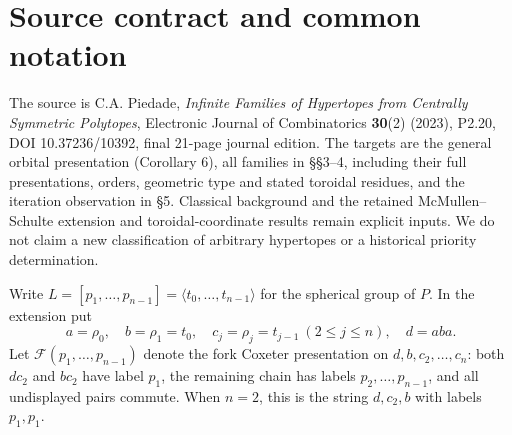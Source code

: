 
\begin{abstract}

We recover the finite matching extensions and regular halved hypertopes associated with every centrally symmetric spherical regular polytope. One orbital-presentation theorem and one parity rewriting give the full defining presentations. The exceptional calculation is an exact orbit census in five finite Coxeter actions. Four published censuses are correct. For the 120-cell there are 35 unordered diagonal classes, rather than the asserted 15; the published presentation omits 20 orbit relations and defines an infinite group for every parameter. We give the missing relations explicitly. The intended finite 120-cell construction, its order and its halved geometry remain valid with the corrected presentation. The original construction and families are attributed to their sources; the correction is distinct from a new open-conjecture solution.

\end{abstract}

\section{Source contract and common notation}\label{source-contract-and-common-notation}

The source is C.A. Piedade, \emph{Infinite Families of Hypertopes from Centrally Symmetric Polytopes}, Electronic Journal of Combinatorics \textbf{30}(2) (2023), P2.20, DOI 10.37236/10392, final 21-page journal edition. The targets are the general orbital presentation (Corollary 6), all families in §§3--4, including their full presentations, orders, geometric type and stated toroidal residues, and the iteration observation in §5. Classical background and the retained McMullen--Schulte extension and toroidal-coordinate results remain explicit inputs. We do not claim a new classification of arbitrary hypertopes or a historical priority determination.

Write \(L=[p_1,\ldots,p_{n-1}]=\langle t_0,\ldots,t_{n-1}\rangle\) for the spherical group of \(P\). In the extension put
\[
 a=\rho_0,\quad b=\rho_1=t_0,\quad c_j=\rho_j=t_{j-1}\ (2\le j\le n),
 \quad d=aba.
\]
Let \(\mathcal F(p_1,\ldots,p_{n-1})\) denote the fork Coxeter presentation on \(d,b,c_2,\ldots,c_n\): both \(dc_2\) and \(bc_2\) have label \(p_1\), the remaining chain has labels \(p_2,\ldots,p_{n-1}\), and all undisplayed pairs commute. When \(n=2\), this is the string \(d,c_2,b\) with labels \(p_1,p_1\).

